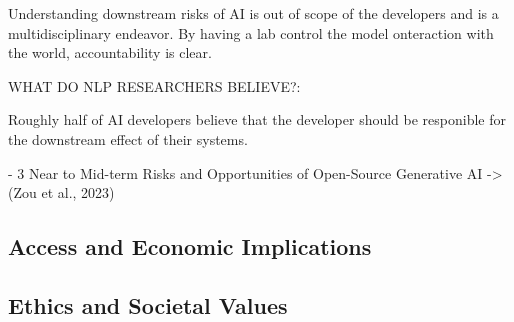 Understanding downstream risks of AI is out of scope of the developers and is a multidisciplinary endeavor. By having a lab control the model onteraction with the world, accountability is clear.

WHAT DO NLP RESEARCHERS BELIEVE?:

Roughly half of AI developers believe that the developer should be responible for the downstream effect of their systems.

\citep{solaiman_evaluating_2024}

- 3 Near to Mid-term Risks and Opportunities of Open-Source Generative AI -> (Zou et al., 2023)
\citep{zou_universal_2023}

\subsection{Access and Economic Implications}

\subsection{Ethics and Societal Values}
